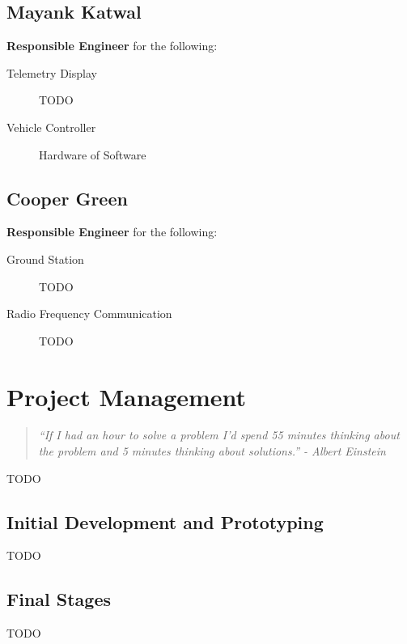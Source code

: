 \documentclass{article}
\begin{document}
\subsection{Mayank Katwal}

\textbf{Responsible Engineer} for the following:

\begin{description}
	\item [Telemetry Display] TODO
	\item [Vehicle Controller] Hardware of Software
\end{description}

\subsection{Cooper Green}

\textbf{Responsible Engineer} for the following:

\begin{description}
	\item [Ground Station] TODO
	\item [Radio Frequency Communication] TODO
\end{description}

\section{Project Management}

\begin{quote}
	\textit{``If I had an hour to solve a problem I'd spend 55 minutes
	thinking about the problem and 5 minutes thinking about
	solutions.'' - Albert Einstein}
\end{quote}

TODO

\subsection{Initial Development and Prototyping}

TODO

\subsection{Final Stages}

TODO
\end{document}
